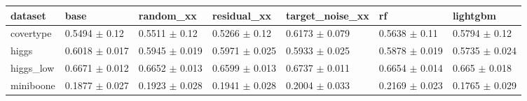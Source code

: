 \begin{tabular}{lllllll}
\toprule
dataset & base & random\_xx & residual\_xx & target\_noise\_xx & rf & lightgbm \\
\midrule
covertype & 0.5494 $\pm$ 0.12 & 0.5511 $\pm$ 0.12 & 0.5266 $\pm$ 0.12 & 0.6173 $\pm$ 0.079 & 0.5638 $\pm$ 0.11 & 0.5794 $\pm$ 0.12 \\
higgs & 0.6018 $\pm$ 0.017 & 0.5945 $\pm$ 0.019 & 0.5971 $\pm$ 0.025 & 0.5933 $\pm$ 0.025 & 0.5878 $\pm$ 0.019 & 0.5735 $\pm$ 0.024 \\
higgs\_low & 0.6671 $\pm$ 0.012 & 0.6652 $\pm$ 0.013 & 0.6599 $\pm$ 0.013 & 0.6737 $\pm$ 0.011 & 0.6654 $\pm$ 0.014 & 0.665 $\pm$ 0.018 \\
miniboone & 0.1877 $\pm$ 0.027 & 0.1923 $\pm$ 0.028 & 0.1941 $\pm$ 0.028 & 0.2004 $\pm$ 0.033 & 0.2169 $\pm$ 0.023 & 0.1765 $\pm$ 0.029 \\
\bottomrule
\end{tabular}
